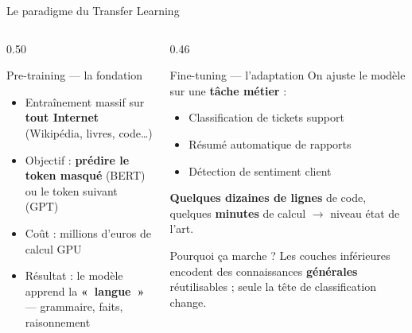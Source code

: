 \documentclass[aspectratio=169, 10pt]{beamer}
\begin{document}
\begin{frame}{Le paradigme du Transfer Learning}
  \begin{columns}[T]
    \begin{column}{0.50\textwidth}
      \begin{alertblock}{Pre-training --- la fondation}
        \begin{itemize}
          \item Entraînement massif sur \textbf{tout Internet}
                (Wikipédia, livres, code\ldots)
          \item Objectif : \textbf{prédire le token masqué} (BERT)
                ou le token suivant (GPT)
          \item Coût : millions d'euros de calcul GPU
          \item Résultat : le modèle apprend la \textbf{«~langue~»}
                --- grammaire, faits, raisonnement
        \end{itemize}
      \end{alertblock}
    \end{column}
    \begin{column}{0.46\textwidth}
      \begin{exampleblock}{Fine-tuning --- l'adaptation}
        On ajuste le modèle sur une \textbf{tâche métier} :
        \begin{itemize}
          \item Classification de tickets support
          \item Résumé automatique de rapports
          \item Détection de sentiment client
        \end{itemize}
        \vspace{4pt}
        \textbf{Quelques dizaines de lignes} de code,
        quelques \textbf{minutes} de calcul $\to$
        niveau état de l'art.
      \end{exampleblock}
      \smallskip
      \begin{block}{Pourquoi ça marche ?}
        Les couches inférieures encodent des
        connaissances \textbf{générales} réutilisables ;
        seule la tête de classification change.
      \end{block}
    \end{column}
  \end{columns}
\end{frame}
\end{document}
